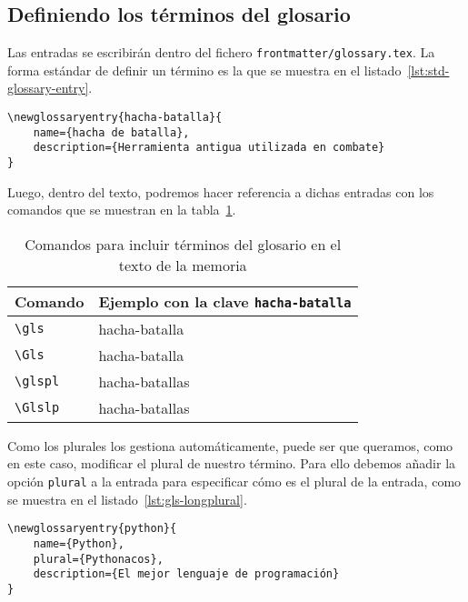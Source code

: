 \subsection{Definiendo los términos del glosario}

Las entradas se escribirán dentro del fichero \texttt{frontmatter/glossary.tex}. La forma estándar de definir un término es la que se muestra en el listado~\ref{lst:std-glossary-entry}.

\begin{lstlisting}[language={[latex]TeX},caption=Código para crear una entrada en el glosario,label=lst:std-glossary-entry]
\newglossaryentry{hacha-batalla}{
    name={hacha de batalla},
    description={Herramienta antigua utilizada en combate}
}
\end{lstlisting}

Luego, dentro del texto, podremos hacer referencia a dichas entradas con los comandos que se muestran en la tabla~\ref{tab:glossary-commands}.

\begin{table}[h]
    \caption{\label{tab:glossary-commands}Comandos para incluir términos del glosario en el texto de la memoria}
    \begin{tabularx}{\textwidth}{@{}lX@{}}
        \toprule
        \textbf{Comando} & \textbf{Ejemplo con la clave \texttt{hacha-batalla}} \\
        \midrule
        \texttt{\textbackslash gls} & \gls{hacha-batalla} \\
        \texttt{\textbackslash Gls} & \Gls{hacha-batalla} \\
        \texttt{\textbackslash glspl} & \glspl{hacha-batalla} \\
        \texttt{\textbackslash Glslp} & \Glspl{hacha-batalla} \\
        \bottomrule
    \end{tabularx}
\end{table}

Como los plurales los gestiona automáticamente, puede ser que queramos, como en este caso, modificar el plural de nuestro término. Para ello debemos añadir la opción \texttt{plural} a la entrada para especificar cómo es el plural de la entrada, como se muestra en el listado~\ref{lst:gls-longplural}.

\begin{lstlisting}[language={[latex]TeX},caption=Especificando el plural para un término del glosario,label=lst:gls-longplural]
\newglossaryentry{python}{
    name={Python},
    plural={Pythonacos},
    description={El mejor lenguaje de programación}
}
\end{lstlisting}


